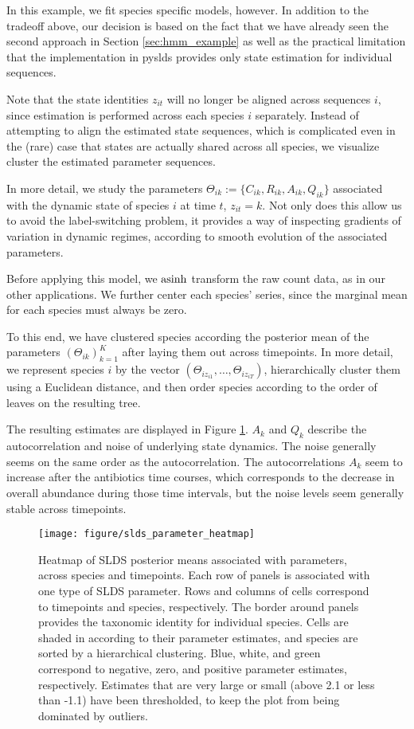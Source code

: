 \documentclass{article}
\begin{document}
In this example, we fit species specific models, however. In addition to the
tradeoff above, our decision is based on the fact that we have already seen the
second approach in Section \ref{sec:hmm_example} as well as the practical
limitation that the implementation in pyslds provides only state estimation for
individual sequences.

Note that the state identities $z_{it}$ will no longer be aligned across
sequences $i$, since estimation is performed across each species $i$ separately.
Instead of attempting to align the estimated state sequences, which is
complicated even in the (rare) case that states are actually shared across all
species, we visualize cluster the estimated parameter sequences.

In more detail, we study the parameters $\Theta_{ik} := \{C_{ik}, R_{ik},
A_{ik}, Q_{ik}\}$ associated with the dynamic state of species $i$ at time $t$,
$z_{it} = k$. Not only does this allow us to avoid the label-switching problem,
it provides a way of inspecting gradients of variation in dynamic regimes,
according to smooth evolution of the associated parameters.

Before applying this model, we $\mathop\mathrm{asinh}$ transform the raw count data, as in our
other applications. We further center each species' series, since the marginal
mean for each species must always be zero.

To this end, we have clustered species according the posterior mean of the
parameters $\left(\Theta_{ik}\right)_{k =1}^{K}$ after laying them out across
timepoints. In more detail, we represent species $i$ by the vector
$\left(\Theta_{i z_{i1}}, \dots, \Theta_{i z_{iT}}\right)$, hierarchically
  cluster them using a Euclidean distance, and then order species according to
  the order of leaves on the resulting tree.

The resulting estimates are displayed in Figure
\ref{fig:slds_parameter_heatmap}. $A_k$ and $Q_k$ describe the autocorrelation
and noise of underlying state dynamics. The noise generally seems on the same
order as the autocorrelation. The autocorrelations $A_{k}$ seem to increase
after the antibiotics time courses, which corresponds to the decrease in overall
abundance during those time intervals, but the noise levels seem generally
stable across timepoints.

\begin{figure}
  \centering
  \texttt{[image: figure/slds\_parameter\_heatmap]}
  \caption{Heatmap of SLDS posterior means associated with parameters, across
    species and timepoints. Each row of panels is associated with one type of
    SLDS parameter. Rows and columns of cells correspond to timepoints and
    species, respectively. The border around panels provides the taxonomic
    identity for individual species. Cells are shaded in according to their
    parameter estimates, and species are sorted by a hierarchical clustering.
    Blue, white, and green correspond to negative, zero, and positive parameter
    estimates, respectively. Estimates that are very large or small (above 2.1
    or less than -1.1) have been thresholded, to keep the plot from being
    dominated by outliers. \label{fig:slds_parameter_heatmap}
  }
\end{figure}
\end{document}
